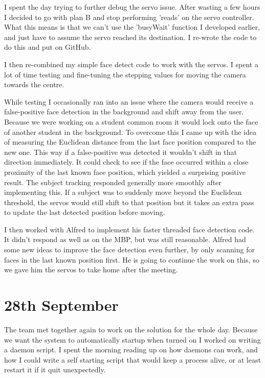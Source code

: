 I spent the day trying to further debug the servo issue. After wasting a few hours I decided to go with plan B and stop performing 'reads' on the servo controller. What this means is that we can't use the 'busyWait' function I developed earlier, and just have to assume the servo reached its destination. I re-wrote the code to do this and put on GitHub.

I then re-combined my simple face detect code to work with the servos. I spent a lot of time testing and fine-tuning the stepping values for moving the camera towards the centre.

While testing I occasionally ran into an issue where the camera would receive a false-positive face detection in the background and shift away from the user. Because we were working on a student common room it would lock onto the face of another student in the background. To overcome this I came up with the idea of measuring the Euclidean distance from the last face position compared to the new one. This way if a false-positive was detected it wouldn't shift in that direction immediately. It could check to see if the face occurred within a close proximity of the last known face position, which yielded a surprising positive result. The subject tracking responded generally more smoothly after implementing this. If a subject was to suddenly move beyond the Euclidean threshold, the servos would still shift to that position but it takes an extra pass to update the last detected position before moving.

I then worked with Alfred to implement his faster threaded face detection code. It didn't respond as well as on the MBP, but was still reasonable. Alfred had some new ideas to improve the face detection even further, by only scanning for faces in the last known position first. He is going to continue the work on this, so we gave him the servos to take home after the meeting.


\section*{28th September}

The team met together again to work on the solution for the whole day. Because we want the system to automatically startup when turned on I worked on writing a daemon script. I spent the morning reading up on how daemons can work, and how I could write a self starting script that would keep a process alive, or at least restart it if it quit unexpectedly.

